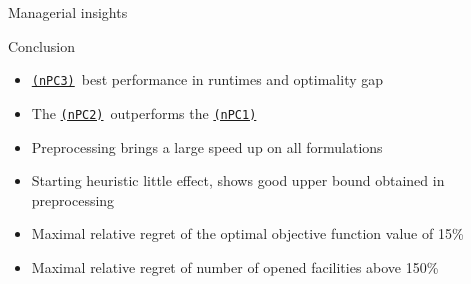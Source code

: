 \documentclass[utf8,aspectratio=1610,ngerman,english]{beamer}
\newcommand{\nPC}{\hyperref[eq:nPC]{\texttt{(nPC1)}}\xspace}
\newcommand{\nPCE}{\hyperref[eq:nPCE]{\texttt{(nPC3)}}\xspace}
\newcommand{\nPCY}{\hyperref[eq:nPCY]{\texttt{(nPC2)}}\xspace}
\begin{document}
\begin{frame}{Managerial insights}
    \begin{figure}
        \begin{minipage}[r]{.48\linewidth}
        \end{minipage}
        \hfill\pause
        \begin{minipage}[l]{.48\linewidth}
        \end{minipage}
        \label{fig:manage}
    \end{figure}
\end{frame}


\begin{frame}{Conclusion}
    \begin{itemize}
        \item \nPCE\ best performance in runtimes and optimality gap
        \item The \nPCY\ outperforms the \nPC
        \item Preprocessing brings a large speed up on all formulations
        \item Starting heuristic little effect, shows good upper bound obtained in preprocessing
        \item Maximal relative regret of the optimal objective function value of 15\%
        \item Maximal relative regret of number of opened facilities above 150\%
    \end{itemize}
\end{frame}

\end{document}

